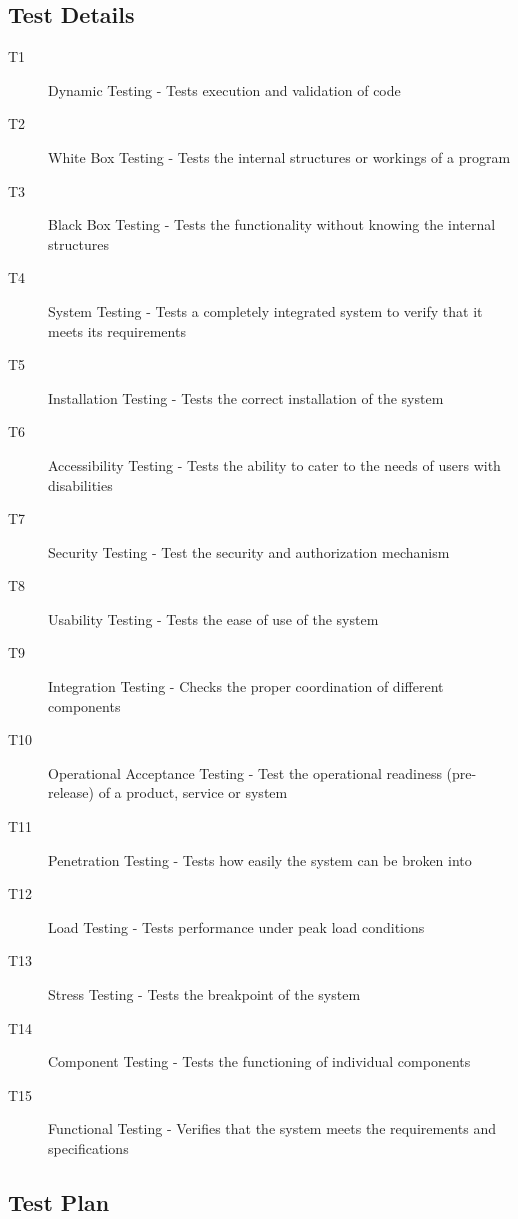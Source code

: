 \documentclass[a4paper,twoside,phd]{BYUPhys}
\begin{document}
\subsection{Test Details}
\begin{description}
\item[T1] Dynamic Testing - Tests execution and validation of code
\item[T2] White Box Testing - Tests the internal structures or workings of a program
\item[T3] Black Box Testing - Tests the functionality without knowing the internal structures
\item[T4] System Testing - Tests a completely integrated system to verify that it meets its requirements
\item[T5] Installation Testing - Tests the correct installation of the system
\item[T6] Accessibility Testing - Tests the ability to cater to the needs of users with disabilities
\item[T7] Security Testing - Test the security and authorization mechanism
\item[T8] Usability Testing - Tests the ease of use of the system
\item[T9] Integration Testing - Checks the proper coordination of different components
\item[T10] Operational Acceptance Testing - Test the operational readiness (pre-release) of a product, service or system
\item[T11] Penetration Testing - Tests how easily the system can be broken into
\item[T12] Load Testing - Tests performance under peak load conditions
\item[T13] Stress Testing - Tests the breakpoint of the system
\item[T14] Component Testing - Tests the functioning of individual components
\item[T15] Functional Testing - Verifies that the system meets the requirements and specifications
\end{description}

\subsection{Test Plan}
\setlength{\arrayrulewidth}{0.2mm}
\setlength{\tabcolsep}{18pt}
\renewcommand{\arraystretch}{2.5}
 
\end{document}
